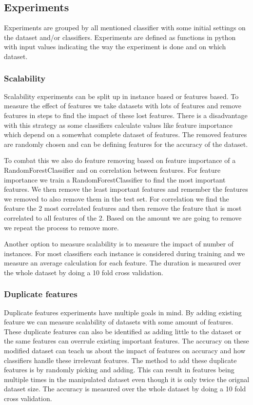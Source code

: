 \documentclass[a4paper,10pt]{article}
\begin{document}
\subsection{Experiments}
Experiments are grouped by all mentioned classifier with some initial settings on the dataset and/or classifiers. Experiments are defined as functions in python with input values indicating the way the experiment is done and on which dataset.
\subsubsection{Scalability}
Scalability experiments can be split up in instance based or features based. To measure the effect of features we take datasets with lots of features and remove features in steps to find the impact of these lost features. There is a disadvantage with this strategy as some classifiers calculate values like feature importance which depend on a somewhat complete dataset of features. The removed features are randomly chosen and can be defining features for the accuracy of the dataset. 

To combat this we also do feature removing based on feature importance of a RandomForestClassifier and on correlation between features. For feature importance we train a RandomForestClassifier to find the most important features. We then remove the least important features and remember the features we removed to also remove them in the test set. For correlation we find the feature the 2 most correlated features and then remove the feature that is most correlated to all features of the 2. Based on the amount we are going to remove we repeat the process to remove more.


Another option  to measure scalability is to measure the impact of number of instances. For most classifiers each instance is considered during training and we measure an average calculation for each feature. The duration is measured over the whole dataset by doing a 10 fold cross validation.

\subsubsection{Duplicate features}
Duplicate features experiments have multiple goals in mind. By adding existing feature we can measure scalability of datasets with some amount of features. These duplicate features can also be identified as adding little to the dataset or the same features can overrule existing important features. The accuracy on these modified dataset
can teach us about the impact of features on accuracy and how classifiers handle these irrelevant features. The method to add these duplicate features is by randomly picking and adding. This can result in features being multiple times in the manipulated  dataset even though it is only twice the orignal dataset size. The accuracy is measured over the whole dataset by doing a 10 fold cross validation.
\end{document}
